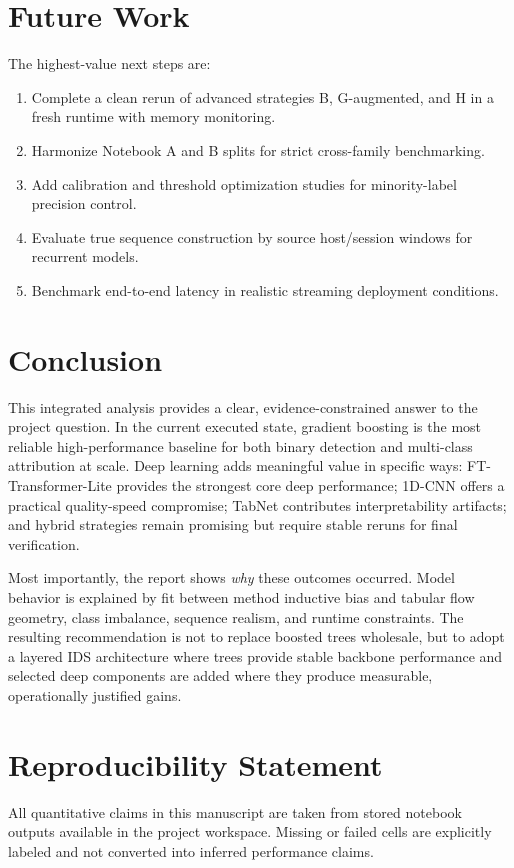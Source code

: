 \documentclass[10pt,journal]{IEEEtran}
\begin{document}
\section{Future Work}
The highest-value next steps are:

\begin{enumerate}
\item Complete a clean rerun of advanced strategies B, G-augmented, and H in a fresh runtime with memory monitoring.
\item Harmonize Notebook A and B splits for strict cross-family benchmarking.
\item Add calibration and threshold optimization studies for minority-label precision control.
\item Evaluate true sequence construction by source host/session windows for recurrent models.
\item Benchmark end-to-end latency in realistic streaming deployment conditions.
\end{enumerate}

\section{Conclusion}
This integrated analysis provides a clear, evidence-constrained answer to the project question. In the current executed state, gradient boosting is the most reliable high-performance baseline for both binary detection and multi-class attribution at scale. Deep learning adds meaningful value in specific ways: FT-Transformer-Lite provides the strongest core deep performance; 1D-CNN offers a practical quality-speed compromise; TabNet contributes interpretability artifacts; and hybrid strategies remain promising but require stable reruns for final verification.

Most importantly, the report shows \emph{why} these outcomes occurred. Model behavior is explained by fit between method inductive bias and tabular flow geometry, class imbalance, sequence realism, and runtime constraints. The resulting recommendation is not to replace boosted trees wholesale, but to adopt a layered IDS architecture where trees provide stable backbone performance and selected deep components are added where they produce measurable, operationally justified gains.

\section*{Reproducibility Statement}
All quantitative claims in this manuscript are taken from stored notebook outputs available in the project workspace. Missing or failed cells are explicitly labeled and not converted into inferred performance claims.



\end{document}

